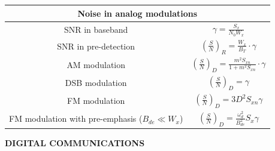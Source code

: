 \documentclass[en]{article}
\begin{document}
\begin{center}
    \renewcommand{\arraystretch}{1}
    \vspace{0.5cm}
    \renewcommand{\arraystretch}{1.5}
    \begin{tabular}{|c|c|}
        \multicolumn{2}{c}{{\bf Noise in analog modulations }} \\
        \hline
        SNR in baseband & $\gamma = \displaystyle\frac{S_x}{N_0 W_x}$ \\
        \hline
        SNR in pre-detection &  $\left ( \displaystyle\frac{S}{N} \right )_R = \displaystyle\frac{W_x}{B_T} \cdot \gamma $\\
        \hline
        AM modulation & $\left ( \displaystyle\frac{S}{N} \right )_D = \displaystyle\frac{m^2 S_{xn}}{1 + m^2 S_{xn}} \cdot \gamma $ \\
        \hline 
        DSB modulation & $\left ( \displaystyle\frac{S}{N} \right )_D = \gamma $ \\
        \hline
        FM modulation & $\left ( \displaystyle\frac{S}{N} \right )_D = 3D^2 S_{xn}\gamma$ \\    
        \hline
        FM modulation with pre-emphasis ($B_{de} \ll W_x$) & $\left ( \displaystyle\frac{S}{N} \right )_D = \displaystyle\frac{\omega_d^2}{B_{de}^2} S_x \gamma$ \\
        \hline
    \end{tabular}      
    \renewcommand{\arraystretch}{1}
    \vspace{0.5cm}


    \newpage

    {\bf DIGITAL COMMUNICATIONS}





\end{center}
\end{document}
